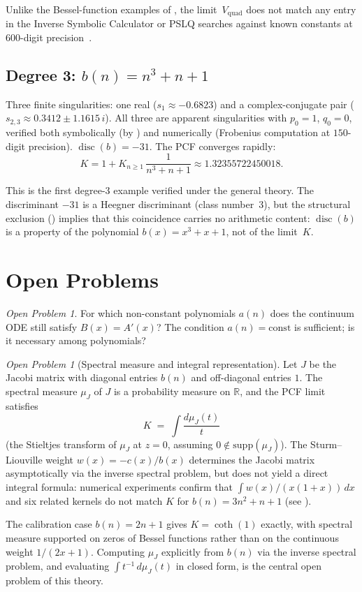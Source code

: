 \documentclass[11pt,a4paper]{amsart}
\theoremstyle{plain}
\theoremstyle{definition}
\theoremstyle{remark}
\newtheorem{open}[theorem]{Open Problem}
\newcommand{\R}{\mathbb{R}}
\newcommand{\disc}{\operatorname{disc}}
\newcommand{\Vquad}{V_{\mathrm{quad}}}
\begin{document}
Unlike the Bessel-function examples of , the
limit~$\Vquad$ does not match any entry in the Inverse Symbolic
Calculator or PSLQ searches against known constants at $600$-digit
precision~\cite{Vquad}.

\subsection{Degree 3: \texorpdfstring{$b(n) = n^3 + n + 1$}{b(n)=n\textasciicircum3+n+1}}

Three finite singularities: one real ($s_1 \approx -0.6823$)
and a complex-conjugate pair
($s_{2,3} \approx 0.3412 \pm 1.1615\,i$).
All three are apparent singularities with $p_0 = 1$, $q_0 = 0$,
verified both symbolically (by ) and
numerically (Frobenius computation at $150$-digit precision).
$\disc(b) = -31$.
The PCF converges rapidly:
\[
  K = 1 + K_{n\ge 1}\,\frac{1}{n^3+n+1}
  \approx 1.32355722450018.
\]

This is the first degree-3 example verified under the general theory.
The discriminant $-31$ is a Heegner discriminant (class number~3),
but the structural exclusion () implies that
this coincidence carries no arithmetic content:
$\disc(b)$ is a property of the polynomial $b(x) = x^3+x+1$,
not of the limit~$K$.

\section{Open Problems}\label{sec:open}

\begin{open}
For which non-constant polynomials $a(n)$ does the continuum ODE
still satisfy $B(x) = A'(x)$?  The condition $a(n) = \text{const}$
is sufficient; is it necessary among polynomials?
\end{open}

\begin{open}[Spectral measure and integral representation]
\label{open:spectral}
Let $J$ be the Jacobi matrix with diagonal
entries $b(n)$ and off-diagonal entries $1$.
The spectral measure $\mu_J$ of $J$ is a
probability measure on $\R$, and the
PCF limit satisfies
\[
  K \;=\; \int \frac{d\mu_J(t)}{t}
\]
(the Stieltjes transform of $\mu_J$ at $z=0$,
assuming $0 \notin \mathrm{supp}(\mu_J)$).
The Sturm--Liouville weight $w(x) = -c(x)/b(x)$
determines the Jacobi matrix asymptotically
via the inverse spectral problem, but does not
yield a direct integral formula: numerical
experiments confirm that $\int w(x)/(x(1+x))\,dx$
and six related kernels do not match $K$
for $b(n) = 3n^2+n+1$ (see ).

The calibration case $b(n) = 2n+1$ gives
$K = \coth(1)$ exactly, with spectral measure
supported on zeros of Bessel functions rather
than on the continuous weight $1/(2x+1)$.
Computing $\mu_J$ explicitly from $b(n)$ via
the inverse spectral problem, and evaluating
$\int t^{-1}\,d\mu_J(t)$ in closed form, is
the central open problem of this theory.
\end{open}
\end{document}
